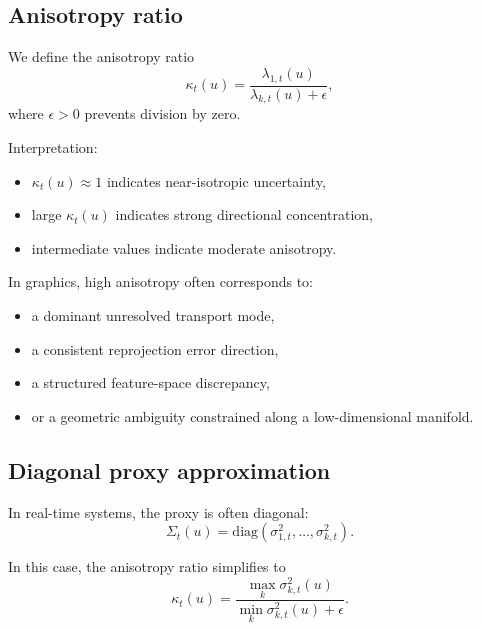 \documentclass[11pt,letterpaper]{article}
\theoremstyle{gcresult}
\theoremstyle{definition}
\begin{document}

\subsection{Anisotropy ratio}

We define the anisotropy ratio
\begin{equation}
\kappa_t(u)=\frac{\lambda_{1,t}(u)}{\lambda_{k,t}(u)+\epsilon},
\end{equation}
where $\epsilon>0$ prevents division by zero.

Interpretation:
\begin{itemize}[leftmargin=1.5em]
    \item $\kappa_t(u)\approx 1$ indicates near-isotropic uncertainty,
    \item large $\kappa_t(u)$ indicates strong directional concentration,
    \item intermediate values indicate moderate anisotropy.
\end{itemize}

In graphics, high anisotropy often corresponds to:
\begin{itemize}[leftmargin=1.5em]
    \item a dominant unresolved transport mode,
    \item a consistent reprojection error direction,
    \item a structured feature-space discrepancy,
    \item or a geometric ambiguity constrained along a low-dimensional manifold.
\end{itemize}


\subsection{Diagonal proxy approximation}

In real-time systems, the proxy is often diagonal:
\begin{equation}
\Sigma_t(u)=\mathrm{diag}(\sigma^2_{1,t},\dots,\sigma^2_{k,t}).
\end{equation}

In this case, the anisotropy ratio simplifies to
\begin{equation}
\kappa_t(u)=\frac{\max_k \sigma^2_{k,t}(u)}{\min_k \sigma^2_{k,t}(u)+\epsilon}.
\end{equation}
\end{document}
